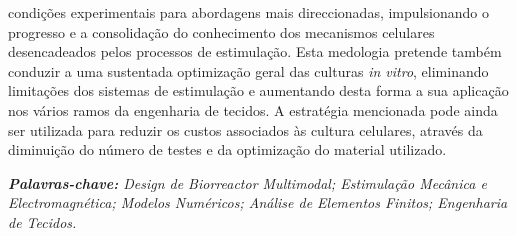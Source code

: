 \documentclass[12pt]{report}
\begin{document}
condições experimentais para abordagens mais direccionadas, impulsionando o progresso e a consolidação do conhecimento dos mecanismos celulares desencadeados pelos processos de estimulação. Esta medologia pretende também conduzir a uma sustentada optimização geral das culturas \textit{in vitro}, eliminando limitações dos sistemas de estimulação e aumentando desta forma a sua aplicação nos vários ramos da engenharia de tecidos. A estratégia mencionada pode ainda ser utilizada para reduzir os custos associados às cultura celulares, através da diminuição do número de testes e da optimização do material utilizado. \newline




\textit{\textbf{Palavras-chave:} Design de Biorreactor Multimodal; Estimulação Mecânica e Electromagnética; Modelos Numéricos; Análise de Elementos Finitos; Engenharia de Tecidos.}



\tableofcontents

\listoffigures

\listoftables

\printacronyms
{}
{}

\cleardoublepage
{}









\newpage
 

\end{document}
